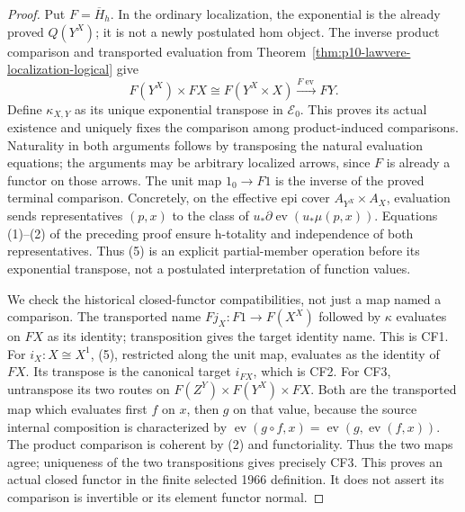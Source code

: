 \begin{proof}
Put \(F=\overline H_h\). In the ordinary localization, the
exponential is the already proved \(Q(Y^X)\); it is not a newly
postulated hom object. The inverse product comparison and transported
evaluation from Theorem~\ref{thm:p10-lawvere-localization-logical} give
\[
 F(Y^X)\times FX\cong F(Y^X\times X)
                       \xrightarrow{F\operatorname{ev}}FY.
                                                               \tag{5}
\]
Define \(\kappa_{X,Y}\) as its unique exponential transpose in
\(\mathcal E_0\). This proves its actual existence and uniquely
fixes the comparison among product-induced comparisons. Naturality in
both arguments follows by transposing the natural evaluation equations;
the arguments may be arbitrary localized arrows, since \(F\) is
already a functor on those arrows. The unit map \(1_0\to F1\)
is the inverse of the proved terminal comparison.
Concretely, on the effective epi cover
\(A_{Y^X}\times A_X\), evaluation sends representatives \((p,x)\)
to the class of \(u_*\partial\operatorname{ev}(u_*\mu(p,x))\).
Equations (1)--(2) of the preceding proof ensure h-totality and
independence of both representatives. Thus (5) is an explicit
partial-member operation before its exponential transpose, not a
postulated interpretation of function values.

We check the historical closed-functor compatibilities, not just a
map named a comparison. The transported name \(Fj_X:F1\to F(X^X)\)
followed by \(\kappa\) evaluates on \(FX\) as its identity;
transposition gives the target identity name. This is CF1. For
\(i_X:X\cong X^1\), (5), restricted along the unit map, evaluates
as the identity of \(FX\). Its transpose is the canonical target
\(i_{FX}\), which is CF2. For CF3, untranspose its two routes
on
\(F(Z^Y)\times F(Y^X)\times FX\). Both are the transported
map which evaluates first \(f\) on \(x\), then \(g\) on that
value, because the source internal composition is characterized by
\(\operatorname{ev}(g\circ f,x)=\operatorname{ev}(g,
\operatorname{ev}(f,x))\). The product comparison is coherent by
(2) and functoriality. Thus the two maps agree; uniqueness of the
two transpositions gives precisely CF3. This proves an actual closed
functor in the finite selected 1966 definition. It does not assert its
comparison is invertible or its element functor normal.


\end{proof}
